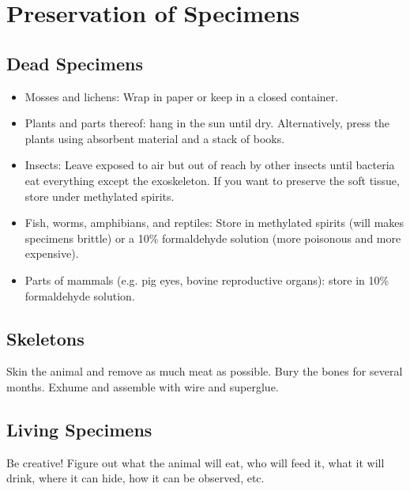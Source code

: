 \chapter{Preservation of Specimens}

\section{Dead Specimens}
\begin{itemize}

\item{Mosses and lichens: 
Wrap in paper or keep in a closed container.}

\item{Plants and parts thereof: 
hang in the sun until dry. 
Alternatively, press the plants using absorbent material and a stack of books.}

\item{Insects: 
Leave exposed to air but out of reach by other insects 
until bacteria eat everything except the exoskeleton. 
If you want to preserve the soft tissue, 
store under methylated spirits.}

\item{Fish, worms, amphibians, and reptiles: 
Store in methylated spirits (will makes specimens brittle) 
or a 10\% formaldehyde solution (more poisonous and more expensive).}

\item{Parts of mammals (e.g. pig eyes, bovine reproductive organs): 
store in 10\% formaldehyde solution.}

\end{itemize}

\section{Skeletons}
Skin the animal and remove as much meat as possible. 
Bury the bones for several months. 
Exhume and assemble with wire and superglue.

\section{Living Specimens}
Be creative! 
Figure out what the animal will eat, 
who will feed it, what it will drink, where it can hide, 
how it can be observed, etc.
